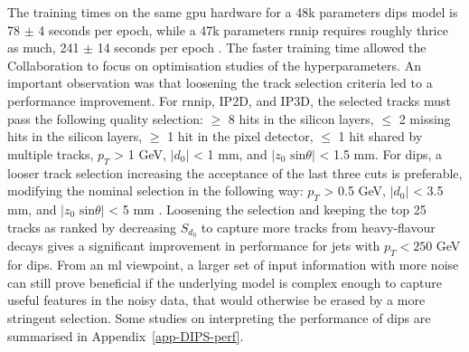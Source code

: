 The training times on the same \gls{gpu} hardware for a 48k parameters \gls{dips} model is 78 $\pm$ 4 seconds per epoch, while a 47k parameters \gls{rnnip} requires roughly thrice as much, 241 $\pm$ 14 seconds per epoch \cite{ATL-PHYS-PUB-2020-014}. The faster training time allowed the Collaboration to focus on optimisation studies of the hyperparameters. An important observation was that loosening the track selection criteria led to a performance improvement. For \gls{rnnip}, IP2D, and IP3D, the selected tracks must pass the following quality selection: $\geq$ 8 hits in the silicon layers, $\leq$ 2 missing hits in the silicon layers, $\geq$ 1 hit in the pixel detector, $\leq$ 1 hit shared by multiple tracks, $p_T$ > 1 GeV, $|d_0|$ < 1 mm, and $|z_0 \textrm{ sin}\theta|$ < 1.5 mm. For \gls{dips}, a looser track selection increasing the acceptance of the last three cuts is preferable, modifying the nominal selection in the following way: $p_T$ > 0.5 GeV, $|d_0|$ < 3.5 mm, and $|z_0 \textrm{ sin}\theta|$ < 5 mm \cite{ATL-PHYS-PUB-2020-014}. Loosening the selection and keeping the top 25 tracks as ranked by decreasing $S_{d_0}$ to capture more tracks from heavy-flavour decays gives a significant improvement in performance for jets with $p_T < 250$ GeV for \gls{dips}. From an \gls{ml} viewpoint, a larger set of input information with more noise can still prove beneficial if the underlying model is complex enough to capture useful features in the noisy data, that would otherwise be erased by a more stringent selection. Some studies on interpreting the performance of \gls{dips} are summarised in Appendix~\ref{app-DIPS-perf}. %

